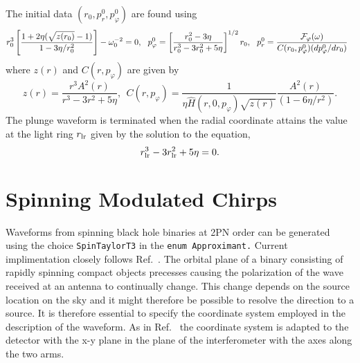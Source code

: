 The initial data $(r_0, p_{r}^0, p_{\varphi}^0)$ are found using
\begin{equation}
r_0^3 \left [ \frac {1 + 2 \eta (\sqrt{z(r_0)} -1 )}{1- 3\eta/r_0^2} \right ]-  \omega_0^{-2} = 0,\ \ 
p^0_\varphi = \left [\frac {r_0^2 - 3 \eta}{r_0^3 - 3 r_0^2 + 5 \eta} \right ]^{1/2}r_0,\ \ 
p^0_r = \frac {{\cal F}_\varphi(\omega)}{C(r_0,p^0_\varphi) (dp^0_\varphi/dr_0)}\ \ 
\end{equation}
where $z(r)$ and $C(r,p_\varphi)$ are given by
\begin{equation}
z(r) = \frac{r^3 A^2(r)}{r^3-3r^2+5 \eta},\ \ 
C(r,p_\varphi) = \frac{1}{\eta \widehat{H} (r,0,p_\varphi)
 \sqrt{z(r)}} \frac{A^2(r)}{(1-6\eta/r^2)}.
\end{equation}
The plunge waveform is terminated when the radial coordinate attains the value
at the light ring $r_{\rm lr}$ given by the solution to the equation,
\begin{equation}
r_{\rm lr}^3 - 3 r_{\rm lr}^2 + 5 \eta = 0.
\label{eq:LightRing}
\end{equation}
\section{Spinning Modulated Chirps}
Waveforms from spinning black hole binaries at 2PN order can be
generated using the choice {\tt SpinTaylorT3} in the {\tt enum
Approximant.} Current implimentation closely follows Ref.~\cite{ACST94}.
The orbital plane of a binary consisting of rapidly spinning compact
objects precesses causing the polarization of the wave received at an
antenna to continually change. This change depends on the source location
on the sky and it might therefore be possible to resolve the direction
to a source. It is therefore essential to specify the coordinate system 
employed in the description of the waveform. As in Ref.~\cite{ACST94}
the coordinate system is adapted to the detector with the x-y plane
in the plane of the interferometer with the axes along the two arms.

